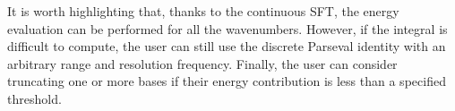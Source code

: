 It is worth highlighting that, thanks to the continuous \ac{SFT}, the energy evaluation can be performed for all the wavenumbers. However, if the integral is difficult to compute, the user can still use the discrete Parseval identity with an arbitrary range and resolution frequency.
Finally, the user can consider truncating one or more bases if their energy contribution is less than a specified threshold.

